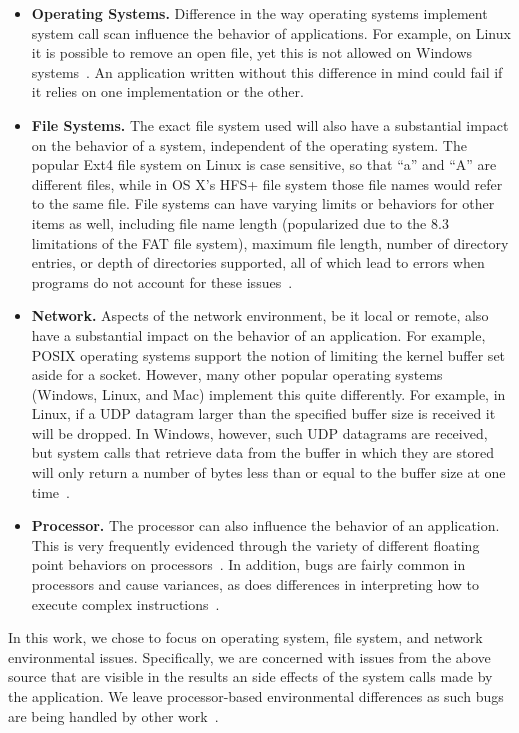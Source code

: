 \begin{itemize}

\item {\bf Operating Systems.} Difference in the way operating systems
implement system call scan influence the behavior of applications.  For
example, on Linux it is possible to remove an open file, yet this is not
allowed on Windows systems~\cite{UnlinkStandard}.  An application
written without this difference in mind could fail if it relies on one
implementation or the other.

\item {\bf File Systems.}  The exact file system used will also have a
substantial impact on the behavior of a system, independent of the
operating system.  The popular Ext4 file system on Linux is case sensitive,
so that ``a'' and ``A'' are different files, while in OS X's HFS+ file system
those file names would refer to the same file.
File systems can have varying limits or behaviors for other items as well,
including file name length (popularized due to the 8.3 limitations of the
FAT file system), maximum file length, number of directory entries, or
depth
of directories supported, all of which lead to errors when programs
do not account for these issues~\cite{EXT4Layout, AppleHFS}.

\item {\bf Network.}  Aspects of the network environment, be it local or
remote, also have a
substantial impact on the behavior of an application.
For example, POSIX operating
systems support the notion of limiting the kernel buffer set aside for a
socket.  However, many other popular operating
systems (Windows, Linux, and Mac)
implement this quite differently.  For example, in Linux, if a UDP datagram
larger than the specified buffer size is received it will be dropped.  In
Windows, however, such
UDP datagrams are
received, but system calls that retrieve data from the buffer in which
they are
stored will only return a number of bytes less than or equal to the
buffer size at one time~\cite{Zhuang_NSDI_2014}.

\item {\bf Processor.}  The processor can also influence the
behavior of an application.  This is very frequently
evidenced through the variety of different floating point behaviors on
processors~\cite{ArbitraryPrecision}.  In addition, bugs are fairly common
in processors and cause variances, as does differences in interpreting
how to execute complex instructions~\cite{Microarch}.

\end{itemize}


In this work, we chose to focus on operating system,
file system, and network
environmental issues.
Specifically, we are concerned with issues from the above source that are
visible in the results an side effects of the system calls made by the
application.  We leave processor-based environmental differences as such
bugs are being handled by other
work~\cite{Alglave:2018:FSC:3173162.3177156}.
